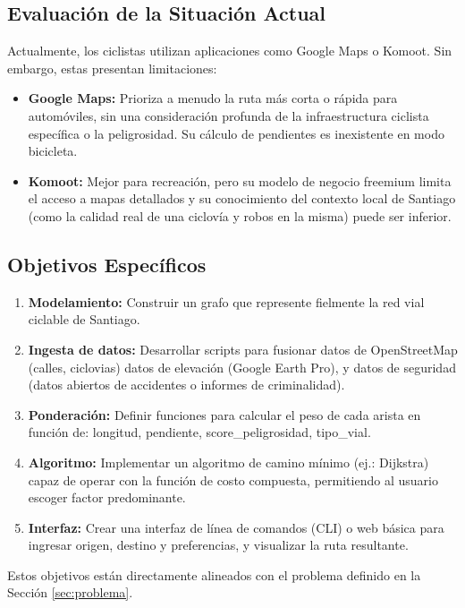 \documentclass[12pt, a4paper, spanish]{article}
\begin{document}
\subsection{Evaluación de la Situación Actual}
Actualmente, los ciclistas utilizan aplicaciones como Google Maps o Komoot. Sin embargo, estas presentan limitaciones:
\begin{itemize}
    \item \textbf{Google Maps:} Prioriza a menudo la ruta más corta o rápida para automóviles, sin una consideración profunda de la infraestructura ciclista específica o la peligrosidad. Su cálculo de pendientes es inexistente en modo bicicleta.
    \item \textbf{Komoot:} Mejor para recreación, pero su modelo de negocio freemium limita el acceso a mapas detallados y su conocimiento del contexto local de Santiago (como la calidad real de una ciclovía y robos en la misma) puede ser inferior.
\end{itemize}

\subsection{Objetivos Específicos}
\begin{enumerate}
    \item \textbf{Modelamiento:} Construir un grafo que represente fielmente la red vial ciclable de Santiago.
    \item \textbf{Ingesta de datos:} Desarrollar scripts para fusionar datos de OpenStreetMap (calles, ciclovias) datos de elevación (Google Earth Pro), y datos de seguridad (datos abiertos de accidentes o informes de criminalidad).
    \item \textbf{Ponderación:} Definir funciones para calcular el peso de cada arista en función de: longitud, pendiente, score\_peligrosidad, tipo\_vial.
    \item \textbf{Algoritmo:} Implementar un algoritmo de camino mínimo (ej.: Dijkstra) capaz de operar con la función de costo compuesta, permitiendo al usuario escoger factor predominante.
    \item \textbf{Interfaz:} Crear una interfaz de línea de comandos (CLI) o web básica para ingresar origen, destino y preferencias, y visualizar la ruta resultante.
\end{enumerate}
Estos objetivos están directamente alineados con el problema definido en la Sección \ref{sec:problema}.

\end{document}
